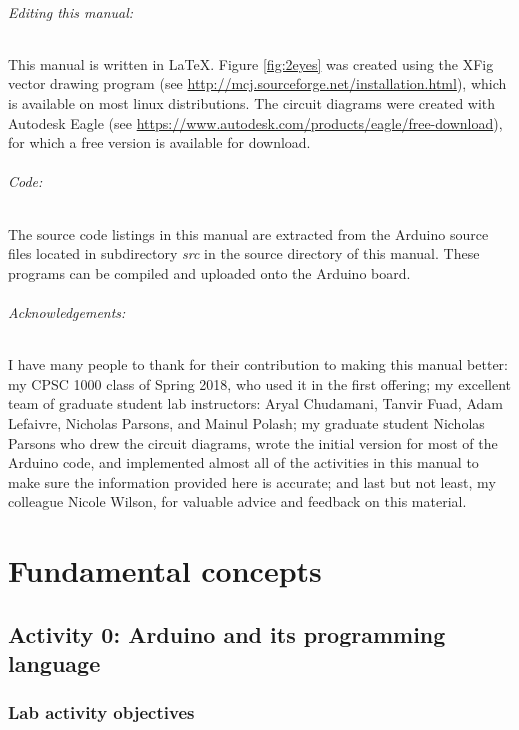 \documentclass[12pt]{book}
\begin{document}
\paragraph{Editing this manual:} This manual is written in
\LaTeX. Figure \ref{fig:2eyes} was created using the XFig vector
drawing program (see
\url{http://mcj.sourceforge.net/installation.html}), which is
available on most linux distributions. The circuit diagrams were
created with Autodesk Eagle (see
\url{https://www.autodesk.com/products/eagle/free-download}), for
which a free version is available for download.

\paragraph{Code:} The source code listings in this manual are
extracted from the Arduino source files located in subdirectory \emph{src} in
the source directory of this manual. These programs can be compiled
and uploaded onto the Arduino board. 

\paragraph{Acknowledgements:} 
I have many people to
thank for their contribution to making this manual better: my CPSC
1000 class of Spring 2018, who used it in the first offering; my
excellent team of graduate student lab instructors: Aryal Chudamani,
Tanvir Fuad, Adam Lefaivre, Nicholas Parsons, and Mainul Polash; my
graduate student Nicholas Parsons who drew the circuit diagrams,
wrote the initial version for most of the Arduino code, and
implemented almost all of the activities in this manual to make sure
the information provided here is accurate; and last but not least, my
colleague Nicole Wilson, for valuable advice and feedback on
this material. 


\mainmatter                             %

\part{Fundamental concepts}

\chapter{Activity 0: Arduino and its programming
  language}\label{activity0.se} 

\section{Lab activity objectives}\label{lab0obj.se}
\end{document}
